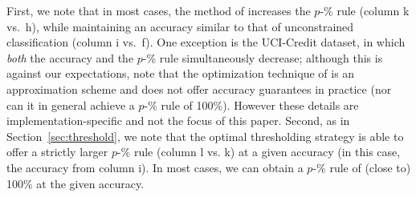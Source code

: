 First, we note that in most cases, 
the method of \cite{zafar2017fairness} increases 
the $p$-\% rule (column k vs.~h),
while maintaining an accuracy similar 
to that of unconstrained classification (column i vs.~f). 
One exception is the UCI-Credit dataset, 
in which \emph{both} the accuracy 
and the $p$-\% rule simultaneously decrease; 
although this is against our expectations, 
note that the optimization technique of \cite{zafar2017fairness} is an approximation scheme 
and does not offer accuracy guarantees in practice (nor can it in general achieve a $p$-\% rule of 100\%). 
However these details are implementation-specific 
and not the focus of this paper.
%
Second, as in Section~\ref{sec:threshold}, 
we note that the optimal thresholding strategy 
is able to offer a strictly larger $p$-\% rule 
(column l vs. k) at a given accuracy 
(in this case, the accuracy from column i). 
In most cases, we can obtain a $p$-\% rule 
of (close to) 100\% at the given accuracy.

